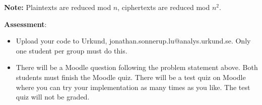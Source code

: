 \documentclass{article}
\begin{document}
\begin{description}
{					\textbf{Note:} Plaintexts are reduced mod $n$, ciphertexts are reduced mod $n^2$.
					
					\textbf{Assessment}:
					\begin{itemize}
						\item Upload your code to Urkund, jonathan.sonnerup.lu@analys.urkund.se. Only one student per group must do this.
						\item There will be a Moodle question following the problem statement above. Both students must finish the Moodle quiz. There will be	a test quiz on Moodle where you can try your implementation as many times as you like. The test quiz will not be graded.
					\end{itemize}}
					
				\end{description}
				
\end{document}
